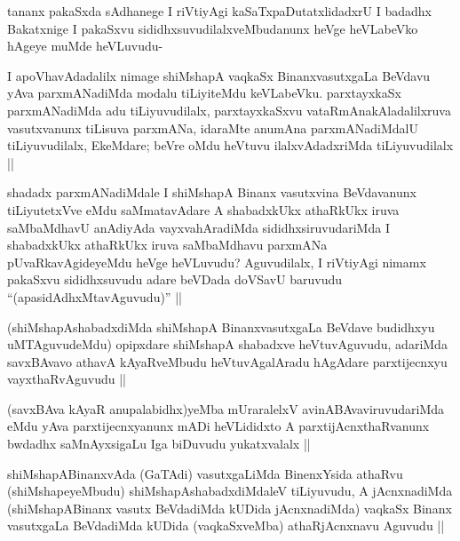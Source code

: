 
\begin{artha}
tananx pakaSxda sAdhanege I riVtiyAgi kaSaTxpaDutatxlidadxrU I badadhx Bakatxnige I pakaSxvu sididhxsuvudilalxveMbudanunx heVge heVLabeVko hAgeye muMde heVLuvudu-
\end{artha}


\begin{artha}
I apoVhavAdadalilx nimage shiMshapA vaqkaSx BinanxvasutxgaLa BeVdavu yAva parxmANadiMda modalu tiLiyiteMdu keVLabeVku. parxtayxkaSx parxmANadiMda adu tiLiyuvudilalx, parxtayxkaSxvu vataRmAnakAladalilxruva vasutxvanunx tiLisuva parxmANa, idaraMte anumAna parxmANadiMdalU tiLiyuvudilalx, EkeMdare; beVre oMdu heVtuvu ilalxvAdadxriMda tiLiyuvudilalx ||
\end{artha}


\begin{artha}
shadadx parxmANadiMdale I shiMshapA Binanx vasutxvina BeVdavanunx tiLiyutetxVve eMdu saMmatavAdare A shabadxkUkx athaRkUkx iruva saMbaMdhavU anAdiyAda vayxvahAradiMda sididhxsiruvudariMda I shabadxkUkx athaRkUkx iruva saMbaMdhavu parxmANa pUvaRkavAgideyeMdu heVge heVLuvudu? Aguvudilalx, I riVtiyAgi nimamx pakaSxvu sididhxsuvudu adare beVDada doVSavU baruvudu ``(apasidAdhxMtavAguvudu)'' ||
\end{artha}


\begin{artha}
(shiMshapAshabadxdiMda shiMshapA BinanxvasutxgaLa BeVdave budidhxyu uMTAguvudeMdu) opipxdare shiMshapA shabadxve heVtuvAguvudu, adariMda savxBAvavo athavA kAyaRveMbudu heVtuvAgalAradu hAgAdare parxtijecnxyu vayxthaRvAguvudu ||
\end{artha}

\begin{artha}
(savxBAva kAyaR anupalabidhx)yeMba mUraralelxV avinABAvaviruvudariMda eMdu yAva parxtijecnxyanunx mADi heVLididxto A parxtijAcnxthaRvanunx bwdadhx saMnAyxsigaLu Iga biDuvudu yukatxvalalx ||
\end{artha}


\begin{artha}
shiMshapABinanxvAda (GaTAdi) vasutxgaLiMda BinenxYsida athaRvu (shiMshapeyeMbudu) shiMshapAshabadxdiMdaleV tiLiyuvudu, A jAcnxnadiMda (shiMshapABinanx vasutx BeVdadiMda kUDida jAcnxnadiMda) vaqkaSx Binanx vasutxgaLa BeVdadiMda kUDida (vaqkaSxveMba) athaRjAcnxnavu Aguvudu ||
\end{artha}

